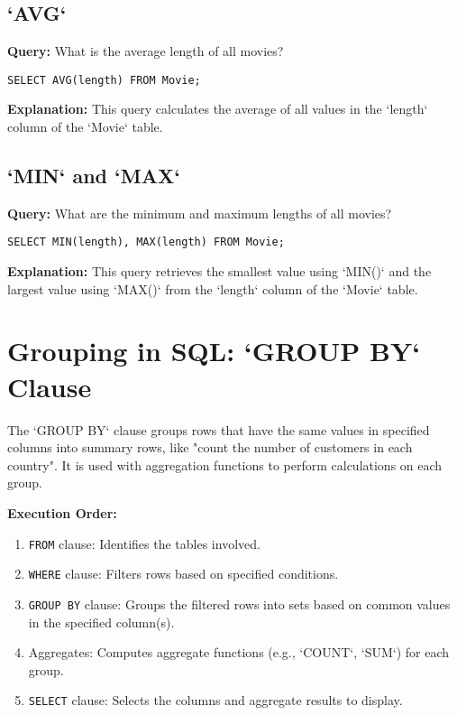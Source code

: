 \documentclass{article}
\begin{document}
\subsection*{`AVG`}
\textbf{Query:} What is the average length of all movies? 
\begin{lstlisting}
SELECT AVG(length) FROM Movie;
\end{lstlisting}
\textbf{Explanation:} This query calculates the average of all values in the `length` column of the `Movie` table.

\subsection*{`MIN` and `MAX`}
\textbf{Query:} What are the minimum and maximum lengths of all movies? 
\begin{lstlisting}
SELECT MIN(length), MAX(length) FROM Movie;
\end{lstlisting}
\textbf{Explanation:} This query retrieves the smallest value using `MIN()` and the largest value using `MAX()` from the `length` column of the `Movie` table.

\section*{Grouping in SQL: `GROUP BY` Clause}
The `GROUP BY` clause groups rows that have the same values in specified columns into summary rows, like "count the number of customers in each country".  It is used with aggregation functions to perform calculations on each group. 

\textbf{Execution Order:} 
\begin{enumerate}
    \item \texttt{FROM} clause: Identifies the tables involved.
    \item \texttt{WHERE} clause: Filters rows based on specified conditions.
    \item \texttt{GROUP BY} clause: Groups the filtered rows into sets based on common values in the specified column(s).
    \item Aggregates: Computes aggregate functions (e.g., `COUNT`, `SUM`) for each group.
    \item \texttt{SELECT} clause: Selects the columns and aggregate results to display.
\end{enumerate}
\end{document}
